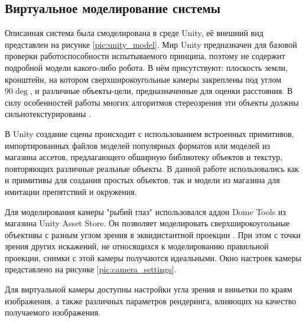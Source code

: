 \subsection{Виртуальное моделирование системы}
Описанная система была смоделирована в среде Unity, её внешний вид представлен на рисунке \ref{pic:unity_model}. Мир 
Unity предназначен для базовой проверки работоспособности испытываемого принципа, поэтому не содержит подробной модели
какого-либо робота. В нём присутствуют: плоскость земли, кронштейн, на котором сверхширокоугольные камеры закреплены под углом $90\deg$, 
и различные объекты-цели, предназначенные для оценки расстояния. В силу особенностей работы многих алгоритмов стереозрения
эти объекты должны сильнотекстурированы \cite{}. %


В Unity создание сцены происходит с использованием встроенных примитивов, импортированных файлов моделей популярных форматов
или моделей из магазина ассетов, предлагающего обширную библиотеку объектов и текстур, повторяющих различные реальные объекты. В данной 
работе использовались как и примитивы для создания простых объектов, так и модели из магазина для имитации препятствий и окружения.

Для моделирования камеры "рыбий глаз" использовался аддон Dome Tools из магазина Unity Asset Store.    %
Он позволяет моделировать сверхширокоугольные объективы с разным углом зрения в эквидистантной проекции \cite{}. %
При этом с точки зрения других искажений, не относящихся к моделированию правильной проекции, снимки с этой камеры получаются идеальными. %
Окно настроек камеры представлено на рисунке \ref{pic:camera_settings}.


Для виртуальной камеры доступны настройки угла зрения и виньетки по краям изображения,  %
а также различных параметров рендеринга, влияющих на качество получаемого изображения. 